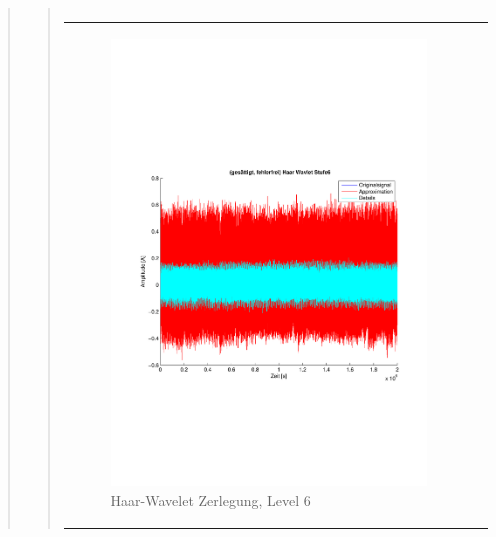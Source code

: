 \begin{quote}
\begin{quote}
\begin{center}
\begin{tabular}{ll}
                \end{tabular}
                \end{center}
                
                
                
          \begin{center}
                \begin{tabular}{ll}
    
                \hspace{-8em}
                    \begin{minipage}{0.6\textwidth}
    
                        \begin{figure}[H]
                            \label{fig:}
                            \includegraphics[scale=0.4, trim = 2cm 6cm 1cm
                            7.5cm,
                            clip]{./Bilder/Termin8/fehlerfrei_gesaettigt_Haar_Wavlet_lvl_6}
                            \caption{Haar-Wavelet Zerlegung, Level 6}
                        \end{figure}
    

\end{minipage}
\end{tabular}
\end{center}
\end{quote}
\end{quote}
